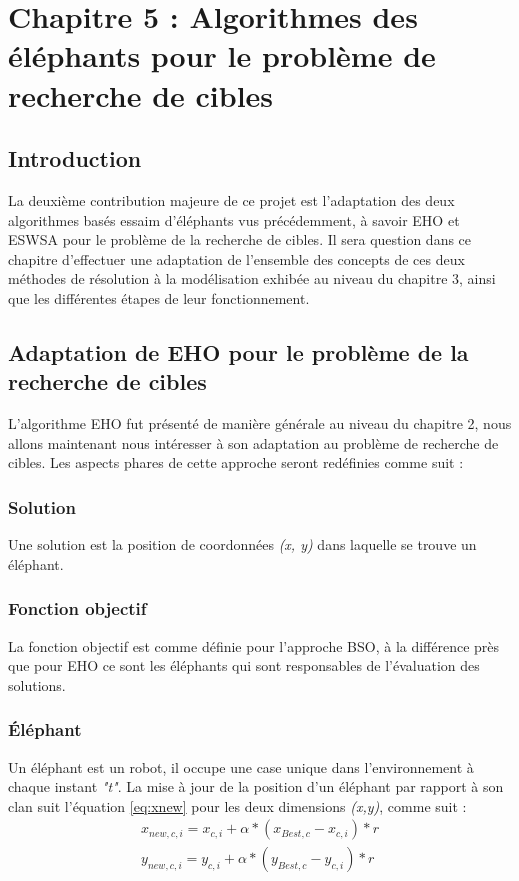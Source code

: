 \chapter{Chapitre 5 : Algorithmes des éléphants pour le problème de recherche de cibles}

\label{Chapter5}

\section{Introduction}
La deuxième contribution majeure de ce projet est l'adaptation des deux algorithmes basés
essaim d'éléphants vus précédemment, à savoir EHO et ESWSA pour le problème de la
recherche de cibles.
Il sera question dans ce chapitre d'effectuer une adaptation de l'ensemble des concepts de ces deux méthodes de résolution à la modélisation exhibée au niveau du chapitre 3, ainsi que les différentes étapes de leur fonctionnement. 


\section{Adaptation de EHO pour le problème de la recherche de cibles}
L'algorithme EHO fut présenté de manière générale au niveau du chapitre 2, nous allons maintenant nous intéresser à son adaptation au problème de recherche de cibles. Les aspects phares de cette approche seront redéfinies comme suit :


\subsection{Solution}
Une solution est la position de coordonnées \textit{(x, y)} dans laquelle se trouve un éléphant.

\subsection{Fonction objectif}
La fonction objectif est comme définie pour l'approche BSO, à la différence près que pour EHO ce sont les éléphants qui sont responsables de l'évaluation des solutions.


\subsection{Éléphant}
Un éléphant est un robot, il occupe une case unique dans l'environnement à chaque instant \textit{"t"}. La mise à jour de la position d'un éléphant par rapport à son clan suit l'équation \ref{eq:xnew} pour les deux dimensions \textit{(x,y)}, comme suit :
\begin{equation}
\begin{split}
{x}_{new,c,i} = {x}_{c,i} + \alpha *( {x}_{Best,c} - {x}_{c, i} ) * r \\
{y}_{new,c,i} = {y}_{c,i} + \alpha *( {y}_{Best,c} - {y}_{c, i} ) * r 
\end{split}
\end{equation}


